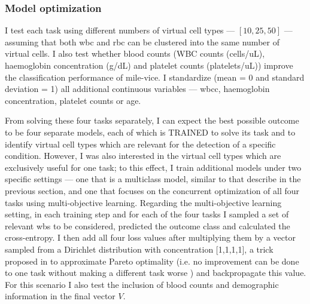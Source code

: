 \subsubsection{Model optimization}

I test each task using different numbers of virtual cell types --- $[10, 25, 50]$ --- assuming that both \ac{wbc} and \ac{rbc} can be clustered into the same number of virtual cells. I also test whether blood counts (WBC counts (cells/uL), haemoglobin concentration (g/dL) and platelet counts (platelets/uL)) improve the classification performance of \ac{mile-vice}. I standardize (mean = 0 and standard deviation = 1) all additional continuous variables --- \ac{wbcc}, haemoglobin concentration, platelet counts or age. 

From solving these four tasks separately, I can expect the best possible outcome to be four separate models, each of which is TRAINED to solve its task and to identify virtual cell types which are relevant for the detection of a specific condition. However, I was also interested in the virtual cell types which are exclusively useful for one task; to this effect, I train additional models under two specific settings --- one that is a multiclass model, similar to that describe in the previous section, and one that focuses on the concurrent optimization of all four tasks using multi-objective learning. Regarding the multi-objective learning setting, in each training step and for each of the four tasks I sampled a set of relevant \ac{wbs} to be considered, predicted the outcome class and calculated the cross-entropy. I then add all four loss values after multiplying them by a vector sampled from a Dirichlet distribution with concentration [1,1,1,1], a trick proposed in \cite{Ruchte2021-ch} to approximate Pareto optimality (i.e. no improvement can be done to one task without making a different task worse \cite{Censor1977-nd}) and backpropagate this value. For this scenario I also test the inclusion of blood counts and demographic information in the final vector $V$.

